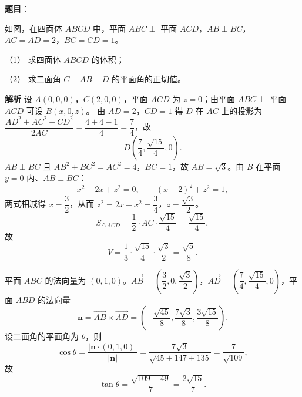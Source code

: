 \begin{answer}

\textbf{题目}：

如图，在四面体 $ABCD$ 中，平面 $ABC\perp$ 平面 $ACD$，$AB\perp BC$，$AC=AD=2$，$BC=CD=1$。

（1） 求四面体 $ABCD$ 的体积；

（2） 求二面角 $C-AB-D$ 的平面角的正切值。
\nopagebreak[4]
\begin{center}\end{center}
\nopagebreak[4]
\textbf{解析}
设 $A(0,0,0)$，$C(2,0,0)$，平面 $ACD$ 为 $z=0$；由平面 $ABC\perp$ 平面 $ACD$ 可设 $B(x,0,z)$。
由 $AD=2$，$CD=1$ 得 $D$ 在 $AC$ 上的投影为 $\dfrac{AD^2+AC^2-CD^2}{2AC}=\dfrac{4+4-1}4=\dfrac74$，故
\nopagebreak[4]
\[D\left(\frac74,\frac{\sqrt{15}}4,0\right).\]
$AB\perp BC$ 且 $AB^2+BC^2=AC^2=4$，$BC=1$，故 $AB=\sqrt3$。由 $B$ 在平面 $y=0$ 内、$AB\perp BC$：
\nopagebreak[4]
\[x^2-2x+z^2=0,\qquad (x-2)^2+z^2=1,\]
两式相减得 $x=\dfrac32$，从而 $z^2=2x-x^2=\dfrac34$，$z=\dfrac{\sqrt3}2$。
\nopagebreak[4]
\[S_{\triangle ACD}=\frac12\cdot AC\cdot\frac{\sqrt{15}}4=\frac{\sqrt{15}}4,\]
故
\nopagebreak[4]
\[V=\frac13\cdot\frac{\sqrt{15}}4\cdot\frac{\sqrt3}2=\frac{\sqrt5}8.\]

平面 $ABC$ 的法向量为 $(0,1,0)$。$\overrightarrow{AB}=\left(\dfrac32,0,\dfrac{\sqrt3}2\right)$，$\overrightarrow{AD}=\left(\dfrac74,\dfrac{\sqrt{15}}4,0\right)$，平面 $ABD$ 的法向量
\nopagebreak[4]
\[\boldsymbol n=\overrightarrow{AB}\times\overrightarrow{AD}=\left(-\frac{\sqrt{45}}8,\frac{7\sqrt3}8,\frac{3\sqrt{15}}8\right).\]
设二面角的平面角为 $\theta$，则
\nopagebreak[4]
\[\cos\theta=\frac{|\boldsymbol n\cdot(0,1,0)|}{|\boldsymbol n|}=\frac{7\sqrt3}{\sqrt{45+147+135}}=\frac{7}{\sqrt{109}},\]
故
\nopagebreak[4]
\[\tan\theta=\frac{\sqrt{109-49}}7=\frac{2\sqrt{15}}7.\]



\end{answer}
